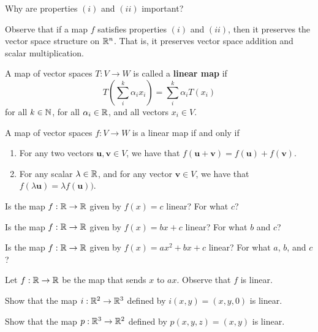 \begin{motivating}
Why are properties $(i)$ and $(ii)$ important?
\end{motivating}

Observe that if a map $f$ satisfies properties $(i)$ and $(ii)$, then it preserves the vector space structure on $\mathbb{R}^n$.  That is, it preserves vector space addition and scalar multiplication.


\begin{definition}\label{def:linearmap}
A map of vector spaces $T : V \to W$ is called a \textbf{linear map} if $$T \left(\sum_i^k \alpha_i x_i\right) = \sum_i^k \alpha_i T(x_i)$$
for all $k \in \mathbb{N}$, for all $\alpha_i \in \mathbb{R}$, and all vectors $x_i \in V$.
\end{definition}

\begin{proposition}
A map of vector spaces $f: V \to W$ is a linear map if and only if 

\begin{enumerate}[label=(\roman*)]
        \item For any two vectors $\bm{u}, \bm{v} \in V$, we have that $f(\bm{u}+ \bm{v}) = f(\bm{u}) + f(\bm{v})$.
        \item For any scalar $\lambda \in \mathbb{R}$, and for any vector $\bm{v} \in V$, we have that $f(\lambda \bm{u}) = \lambda f(\bm{u}))$.
    \end{enumerate}
\end{proposition}

    \begin{example}
    Is the map $f : \mathbb{R} \to \mathbb{R}$ given by $f(x) = c$ linear? For what $c$?
    
    Is the map $f : \mathbb{R} \to \mathbb{R}$ given by $f(x) = bx + c$ linear? For what $b$ and $c$?
    
    Is the map $f : \mathbb{R} \to \mathbb{R}$ given by $f(x) = ax^2 +bx + c$ linear? For what $a$, $b$, and $c$?
    \end{example}

\begin{example}
    Let $f: \mathbb{R} \to \mathbb{R}$ be the map that sends $x$ to $ax$. Observe that $f$ is linear.
\end{example}

\begin{example}
Show that the map $i: \mathbb{R}^2 \to \mathbb{R}^3$ defined by $i(x,y) = (x,y,0)$ is linear.
\end{example}

\begin{example}
Show that the map $p: \mathbb{R}^3 \to \mathbb{R}^2$ defined by $p(x,y,z) = (x,y)$ is linear.
\end{example}

